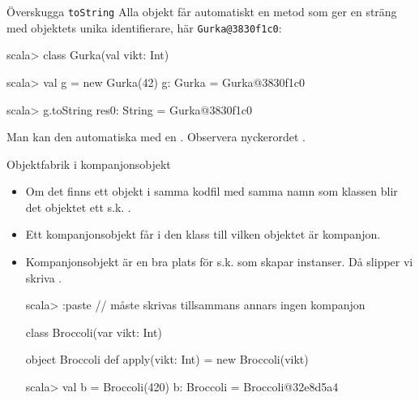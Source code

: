 \begin{Slide}{Överskugga \texttt{toString}}
Alla objekt får automatiskt en metod  som ger en sträng med objektets unika identifierare, här \texttt{Gurka@3830f1c0}:
\begin{REPL}
scala> class Gurka(val vikt: Int) 

scala> val g = new Gurka(42)
g: Gurka = Gurka@3830f1c0

scala> g.toString
res0: String = Gurka@3830f1c0
\end{REPL}
Man kan  den automatiska   med en . Observera nyckerordet .
\end{Slide}





\begin{Slide}{Objektfabrik i kompanjonsobjekt}%
\begin{itemize}
\item Om det finns ett objekt i samma kodfil med samma namn som klassen blir det objektet ett s.k.   .

\item Ett kompanjonsobjekt får  i den klass till vilken objektet är kompanjon.

\item Kompanjonsobjekt är en bra plats för s.k.  som skapar instanser. Då slipper vi skriva .
\begin{REPL}
scala> :paste   // måste skrivas tillsammans annars ingen kompanjon

class Broccoli(var vikt: Int) 

object Broccoli {
  def apply(vikt: Int) = new Broccoli(vikt)
}

scala> val b = Broccoli(420)
b: Broccoli = Broccoli@32e8d5a4
\end{REPL}

\end{itemize}
\end{Slide}


